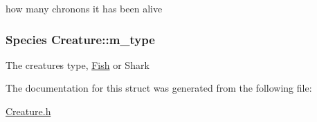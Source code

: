 how many chronons it has been alive \hypertarget{structCreature_aa0d3236cdcdd452525158e7240e80fac}{
\subsubsection[{m\-\_\-type}]{\setlength{\rightskip}{0pt plus 5cm}\-Species {\bf \-Creature\-::m\-\_\-type}}}\label{structCreature_aa0d3236cdcdd452525158e7240e80fac}
\-The creatures type, \hyperlink{structFish}{\-Fish} or \-Shark 

\-The documentation for this struct was generated from the following file\-:\begin{DoxyCompactItemize}
\item 
\hyperlink{Creature_8h}{\-Creature.\-h}\end{DoxyCompactItemize}
